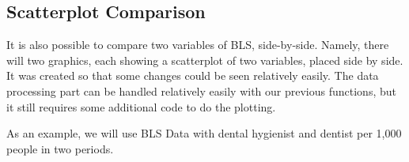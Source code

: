 \documentclass[
]{article}
\begin{document}
\hypertarget{scatterplot-comparison}{%
\subsection{Scatterplot Comparison}\label{scatterplot-comparison}}

It is also possible to compare two variables of BLS, side-by-side.
Namely, there will two graphics, each showing a scatterplot of two
variables, placed side by side. It was created so that some changes
could be seen relatively easily. The data processing part can be handled
relatively easily with our previous functions, but it still requires
some additional code to do the plotting.

As an example, we will use BLS Data with dental hygienist and dentist
per 1,000 people in two periods.
\end{document}
